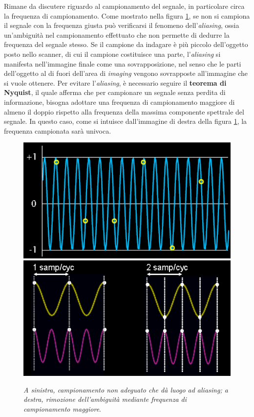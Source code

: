 \documentclass{report}
\newcommand{\figref}[1]{figura \ref{#1}}
\numberwithin{equation}{section}
\numberwithin{figure}{section}
\begin{document}
\vspace{-5 pt}

Rimane da discutere riguardo al campionamento del segnale, in particolare circa la frequenza di campionamento. Come mostrato nella \figref{fig:aliasing}, se non si campiona il segnale con la frequenza giusta può verificarsi il fenomeno dell'\textit{aliasing}, ossia un'ambiguità nel campionamento effettuato che non permette di dedurre la frequenza del segnale stesso. Se il campione da indagare è più piccolo dell'oggetto posto nello scanner, di cui il campione costituisce una parte, l'\textit{aliasing} si manifesta nell'immagine finale come una sovrapposizione, nel senso che le parti dell'oggetto al di fuori dell'area di \textit{imaging} vengono sovrapposte all'immagine che si vuole ottenere. Per evitare l'\textit{aliasing}, è necessario seguire il \textbf{teorema di Nyquist}, il quale afferma che per campionare un segnale senza perdita di informazione, bisogna adottare una frequenza di campionamento maggiore di almeno il doppio rispetto alla frequenza della massima componente spettrale del segnale. In questo caso, come si intuisce dall'immagine di destra della \figref{fig:aliasing}, la frequenza campionata sarà univoca.

\begin{figure}[htp]
\centering
\includegraphics[scale=0.614]{immagini/aliasing.png}\quad\includegraphics[scale=0.518]{immagini/nyquist.png}
\caption{\label{fig:aliasing} \textit{A sinistra, campionamento non adeguato che dà luogo ad aliasing; a destra, rimozione dell'ambiguità mediante frequenza di campionamento maggiore}.}
\end{figure}
\end{document}
